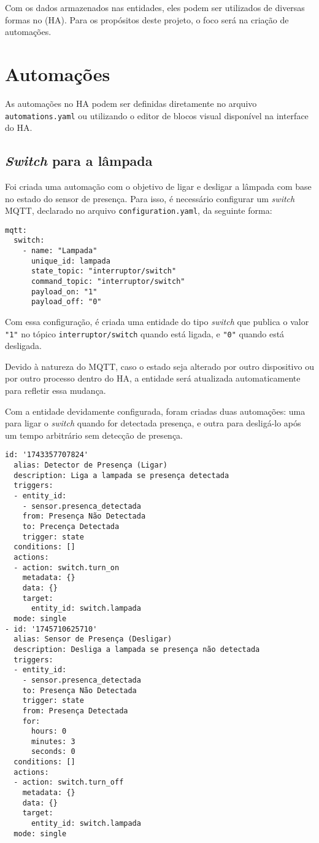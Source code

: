 \documentclass[]{abntex2}
\begin{document}
Com os dados armazenados nas entidades, eles podem ser utilizados de diversas
formas no (HA). Para os propósitos deste projeto, o foco será na
criação de automações.

\section{Automações}
As automações no HA podem ser definidas diretamente no arquivo
\texttt{automations.yaml} ou utilizando o editor de blocos visual disponível na
interface do HA.

\subsection{\textit{Switch} para a lâmpada}

Foi criada uma automação com o objetivo de ligar e desligar a lâmpada com base
no estado do sensor de presença. Para isso, é necessário configurar um
\textit{switch} MQTT, declarado no arquivo \texttt{configuration.yaml}, da
seguinte forma:
\clearpage
\begin{verbatim}
mqtt:
  switch:
    - name: "Lampada"
      unique_id: lampada
      state_topic: "interruptor/switch"
      command_topic: "interruptor/switch"
      payload_on: "1"
      payload_off: "0"
\end{verbatim}
Com essa configuração, é criada uma entidade do tipo \textit{switch} que
publica o valor \texttt{"1"} no tópico \texttt{interruptor/switch} quando está
ligada, e \texttt{"0"} quando está desligada.

Devido à natureza do MQTT, caso o estado seja alterado por outro dispositivo ou
por outro processo dentro do HA, a entidade será atualizada automaticamente
para refletir essa mudança.

Com a entidade devidamente configurada, foram criadas duas automações: uma para
ligar o \textit{switch} quando for detectada presença, e outra para desligá-lo
após um tempo arbitrário sem detecção de presença.

\begin{verbatim}
id: '1743357707824'
  alias: Detector de Presença (Ligar)
  description: Liga a lampada se presença detectada
  triggers:
  - entity_id:
    - sensor.presenca_detectada
    from: Presença Não Detectada
    to: Precença Detectada
    trigger: state
  conditions: []
  actions:
  - action: switch.turn_on
    metadata: {}
    data: {}
    target:
      entity_id: switch.lampada
  mode: single
- id: '1745710625710'
  alias: Sensor de Presença (Desligar)
  description: Desliga a lampada se presença não detectada
  triggers:
  - entity_id:
    - sensor.presenca_detectada
    to: Presença Não Detectada
    trigger: state
    from: Presença Detectada
    for:
      hours: 0
      minutes: 3
      seconds: 0
  conditions: []
  actions:
  - action: switch.turn_off
    metadata: {}
    data: {}
    target:
      entity_id: switch.lampada
  mode: single
\end{verbatim}
\clearpage
\end{document}
